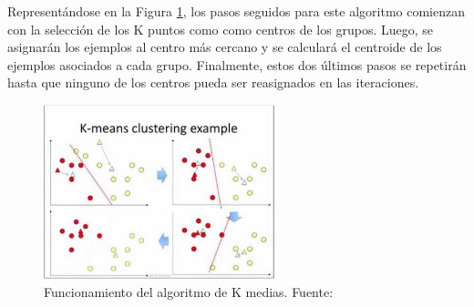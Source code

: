 \begin{itemize}
	Representándose en la Figura \ref{2:fig4}, los pasos seguidos para este algoritmo comienzan con la selección de los K puntos como como centros de los grupos. Luego, se asignarán los ejemplos al centro más cercano y se calculará el centroide de los ejemplos asociados a cada grupo. Finalmente, estos dos últimos pasos se repetirán hasta que ninguno de los centros pueda ser reasignados en las iteraciones.
	\begin{figure}[h]
		\begin{center}
			\includegraphics[width=0.6\textwidth]{2/figures/kmeans.jpg}
			\caption{Funcionamiento del algoritmo de K medias. Fuente: \cite{tec_sancho2018supnosup}}
			\label{2:fig4}
		\end{center}
	\end{figure}
		

\end{itemize}
